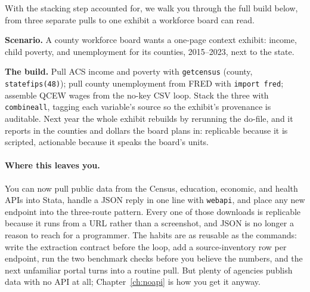 \documentclass[
    a4paper,
    fontsize=10pt,
    twoside=true,
    numbers=noenddot,
]{kaobook}
\newcounter{appliedexample}
\newenvironment{appliedexample}[1][]{%
    \refstepcounter{appliedexample}%
    \begin{appliedexamplebox}[frametitle={Applied Example~\theappliedexample.~~#1}]%
}{%
    \end{appliedexamplebox}%
}
\begin{document}
With the stacking step accounted for, we walk you through the full build below, from three separate pulls to one exhibit a workforce board can read.

\begin{appliedexample}[A Texas county panel from three APIs]\label{ae:ch03-countypanel}
\textbf{Scenario.} A county workforce board wants a one-page context exhibit: income, child poverty, and unemployment for its counties, 2015--2023, next to the state.

\medskip
\textbf{The build.} Pull ACS income and poverty with \texttt{getcensus} (county, \texttt{statefips(48)}); pull county unemployment from FRED with \texttt{import fred}; assemble QCEW wages from the no-key CSV loop. Stack the three with \texttt{combineall}, tagging each variable's source so the exhibit's provenance is auditable. Next year the whole exhibit rebuilds by rerunning the do-file, and it reports in the counties and dollars the board plans in: replicable because it is scripted, actionable because it speaks the board's units.
\end{appliedexample}

\paragraph{Where this leaves you.} You can now pull public data from the Census, education, economic, and health APIs into Stata, handle a JSON reply in one line with \texttt{webapi}, and place any new endpoint into the three-route pattern. Every one of those downloads is replicable because it runs from a URL rather than a screenshot, and JSON is no longer a reason to reach for a programmer. The habits are as reusable as the commands: write the extraction contract before the loop, add a source-inventory row per endpoint, run the two benchmark checks before you believe the numbers, and the next unfamiliar portal turns into a routine pull. But plenty of agencies publish data with no API at all; Chapter~\ref{ch:noapi} is how you get it anyway.
\end{document}
